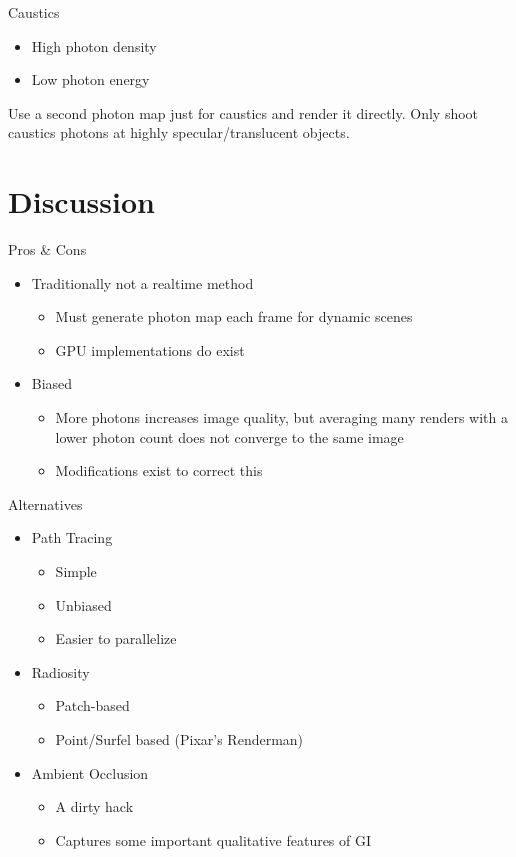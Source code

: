 \documentclass{beamer}
\begin{document}
			\begin{frame}{Caustics}
				\begin{itemize}
					\item<2-> High photon density
					\item<3-> Low photon energy
				\end{itemize}

				\pause Use a second photon map just for caustics and render it directly.
				\pause Only shoot caustics photons at highly specular/translucent objects.
			\end{frame}

	\section{Discussion}
		\begin{frame}{Pros \& Cons}
				\begin{itemize}
					\item<2-> Traditionally not a realtime method
						\begin{itemize}
							\item<3-> Must generate photon map each frame for dynamic scenes
							\item<4-> GPU implementations do exist
						\end{itemize}
					\item<5-> Biased
						\begin{itemize}
							\item<6-> More photons increases image quality, but averaging many renders with a lower photon count does not converge to the same image
							\item<7-> Modifications exist to correct this
						\end{itemize}
				\end{itemize}
		\end{frame}

		\begin{frame}{Alternatives}
			\begin{itemize}
				\item<2-> Path Tracing
					\begin{itemize}
						\item<3-> Simple
						\item<4-> Unbiased
						\item<4-> Easier to parallelize
					\end{itemize}
				\item<5-> Radiosity
					\begin{itemize}
						\item<6-> Patch-based
						\item<7-> Point/Surfel based (Pixar's Renderman)
					\end{itemize}
				\item<5-> Ambient Occlusion
					\begin{itemize}
						\item<6-> A dirty hack
						\item<7-> Captures some important qualitative features of GI
					\end{itemize}
			\end{itemize}
		\end{frame}
\end{document}
